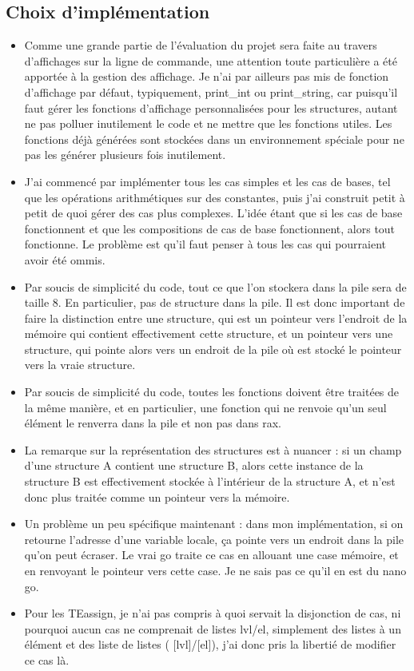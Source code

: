 \documentclass{article}
\begin{document}
\subsection{Choix d'implémentation}
\begin{itemize}
\item Comme une grande partie de l'évaluation du projet sera faite au travers d'affichages sur la ligne de commande, une attention toute particulière a été apportée à la gestion des affichage. Je n'ai par ailleurs pas mis de fonction d'affichage par défaut, typiquement, print\_int ou print\_string, car puisqu'il faut gérer les fonctions d'affichage personnalisées pour les structures, autant ne pas polluer inutilement le code et ne mettre que les fonctions utiles. Les fonctions déjà générées sont stockées dans un environnement spéciale pour ne pas les générer plusieurs fois inutilement.
\item J'ai commencé par implémenter tous les cas simples et les cas de bases, tel que les opérations arithmétiques sur des constantes, puis j'ai construit petit à petit de quoi gérer des cas plus complexes. L'idée étant que si les cas de base fonctionnent et que les compositions de cas de base fonctionnent, alors tout fonctionne. Le problème est qu'il faut penser à tous les cas qui pourraient avoir été ommis.
\item Par soucis de simplicité du code, tout ce que l'on stockera dans la pile sera de taille 8. En particulier, pas de structure dans la pile. Il est donc important de faire la distinction entre une structure, qui est un pointeur vers l'endroit de la mémoire qui contient effectivement cette structure, et un pointeur vers une structure, qui pointe alors vers un endroit de la pile où est stocké le pointeur vers la vraie structure.
\item Par soucis de simplicité du code, toutes les fonctions doivent être traitées de la même manière, et en particulier, une fonction qui ne renvoie qu'un seul élément le renverra dans la pile et non pas dans rax.
\item La remarque sur la représentation des structures est à nuancer : si un champ d'une structure A contient une structure B, alors cette instance de la structure B est effectivement stockée à l'intérieur de la structure A, et n'est donc plus traitée comme un pointeur vers la mémoire.
\item Un problème un peu spécifique maintenant : dans mon implémentation, si on retourne l'adresse d'une variable locale, ça pointe vers un endroit dans la pile qu'on peut écraser. Le vrai go traite ce cas en allouant une case mémoire, et en renvoyant le pointeur vers cette case. Je ne sais pas ce qu'il en est du nano go.
\item Pour les TEassign, je n'ai pas compris à quoi servait la disjonction de cas, ni pourquoi aucun cas ne comprenait de listes lvl/el, simplement des listes à un élément et des liste de listes ( [lvl]/[el]), j'ai donc pris la libertié de modifier ce cas là.
\end{itemize}
\end{document}
